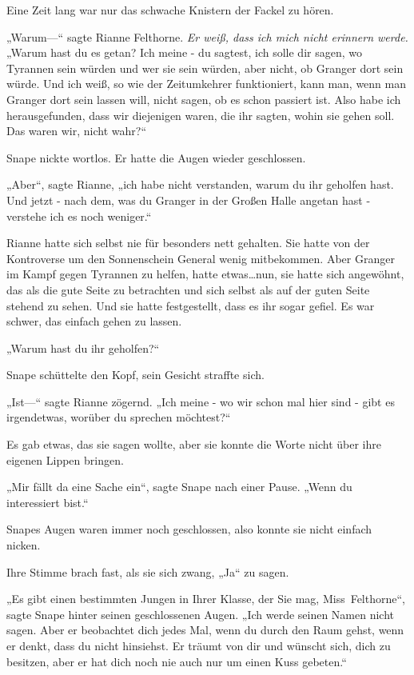{Eine Zeit lang war nur das schwache Knistern der Fackel zu hören.

„Warum—“ sagte Rianne Felthorne. \emph{Er weiß, dass ich mich nicht erinnern werde.} „Warum hast du es getan? Ich meine - du sagtest, ich solle dir sagen, wo Tyrannen sein würden und wer sie sein würden, aber nicht, ob Granger dort sein würde. Und ich weiß, so wie der Zeitumkehrer funktioniert, kann man, wenn man Granger dort sein lassen will, nicht sagen, ob es schon passiert ist. Also habe ich herausgefunden, dass wir diejenigen waren, die ihr sagten, wohin sie gehen soll. Das waren wir, nicht wahr?“

Snape nickte wortlos. Er hatte die Augen wieder geschlossen.

„Aber“, sagte Rianne, „ich habe nicht verstanden, warum du ihr geholfen hast. Und jetzt - nach dem, was du Granger in der Großen Halle angetan hast - verstehe ich es noch weniger.“

Rianne hatte sich selbst nie für besonders nett gehalten. Sie hatte von der Kontroverse um den Sonnenschein General wenig mitbekommen. Aber Granger im Kampf gegen Tyrannen zu helfen, hatte etwas…nun, sie hatte sich angewöhnt, das als die gute Seite zu betrachten und sich selbst als auf der guten Seite stehend zu sehen. Und sie hatte festgestellt, dass es ihr sogar gefiel. Es war schwer, das einfach gehen zu lassen.

„Warum hast du ihr geholfen?“

Snape schüttelte den Kopf, sein Gesicht straffte sich.

„Ist—“ sagte Rianne zögernd. „Ich meine - wo wir schon mal hier sind - gibt es irgendetwas, worüber du sprechen möchtest?“

Es gab etwas, das sie sagen wollte, aber sie konnte die Worte nicht über ihre eigenen Lippen bringen.

„Mir fällt da eine Sache ein“, sagte Snape nach einer Pause. „Wenn du interessiert bist.“

Snapes Augen waren immer noch geschlossen, also konnte sie nicht einfach nicken.

Ihre Stimme brach fast, als sie sich zwang, „Ja“ zu sagen.

„Es gibt einen bestimmten Jungen in Ihrer Klasse, der Sie mag, Miss~Felthorne“, sagte Snape hinter seinen geschlossenen Augen. „Ich werde seinen Namen nicht sagen. Aber er beobachtet dich jedes Mal, wenn du durch den Raum gehst, wenn er denkt, dass du nicht hinsiehst. Er träumt von dir und wünscht sich, dich zu besitzen, aber er hat dich noch nie auch nur um einen Kuss gebeten.“

}
